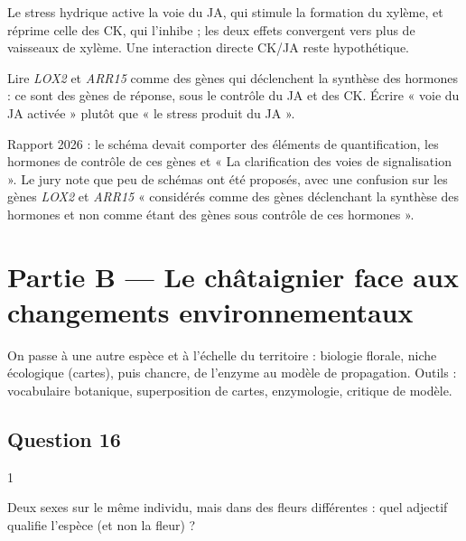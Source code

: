 \documentclass[11pt,a4paper]{article}
\begin{document}
Le stress hydrique active la voie du JA, qui stimule la formation du xylème, et réprime celle des CK, qui l'inhibe ; les deux effets convergent vers plus de vaisseaux de xylème. Une interaction directe CK/JA reste hypothétique.

\begin{piege}

Lire \emph{LOX2} et \emph{ARR15} comme des gènes qui déclenchent la synthèse des hormones : ce sont des gènes de réponse, sous le contrôle du JA et des CK. Écrire « voie du JA activée » plutôt que « le stress produit du JA ».

\end{piege}

\begin{jury}

Rapport 2026 : le schéma devait comporter des éléments de quantification, les hormones de contrôle de ces gènes et « La clarification des voies de signalisation ». Le jury note que peu de schémas ont été proposés, avec une confusion sur les gènes \emph{LOX2} et \emph{ARR15} « considérés comme des gènes déclenchant la synthèse des hormones et non comme étant des gènes sous contrôle de ces hormones ».

\end{jury}

\hypertarget{partie-b-le-chuxe2taignier-face-aux-changements-environnementaux}{%
\section{Partie B --- Le châtaignier face aux changements environnementaux}\label{partie-b-le-chuxe2taignier-face-aux-changements-environnementaux}}

On passe à une autre espèce et à l'échelle du territoire : biologie florale, niche écologique (cartes), puis chancre, de l'enzyme au modèle de propagation. Outils : vocabulaire botanique, superposition de cartes, enzymologie, critique de modèle.

\hypertarget{question-16}{%
\subsection{Question 16}\label{question-16}}

\begin{indication}{1}

Deux sexes sur le même individu, mais dans des fleurs différentes : quel adjectif qualifie l'espèce (et non la fleur) ?

\end{indication}
\end{document}
